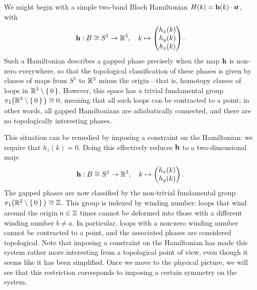 We might begin with a simple two-band Bloch Hamiltonian $H(k) = \vb{h}(k)\cdot\bm{\upsigma}$, with
\[
	\vb{h}: B\cong S^1\to\mathbb{R}^3,\quad k\mapsto\begin{pmatrix}
		h_x(k) \\ h_y(k) \\ h_z(k)
	\end{pmatrix}.
\]
Such a Hamiltonian describes a gapped phase precisely when the map $\vb{h}$ is non-zero everywhere, so that the topological classification of these phases is given by classes of maps from $S^1$ to $\mathbb{R}^3$ minus the origin---that is, homotopy classes of loops in $\mathbb{R}^3\setminus\set{0}$. However, this space has a trivial fundamental group $\pi_1\big(\mathbb{R}^3\setminus\set{0}\big)\cong0$, meaning that all such loops can be contracted to a point; in other words, all gapped Hamiltonians are adiabatically connected, and there are no topologically interesting phases.

This situation can be remedied by imposing a constraint on the Hamiltonian: we require that $h_z(k)=0$. Doing this effectively reduces $\vb{h}$ to a two-dimensional map:
\[
	\vb{h}: B\cong S^1\to\mathbb{R}^3,\quad k\mapsto\begin{pmatrix}
		h_x(k) \\ h_y(k)
	\end{pmatrix}.
\]
The gapped phases are now classified by the non-trivial fundamental group $\pi_1\big(\mathbb{R}^2\setminus\set{0}\big)\cong\mathbb{Z}$. This group is indexed by winding number: loops that wind around the origin $a\in\mathbb{Z}$ times cannot be deformed into those with a different winding number $b\neq a$. In particular, loops with a non-zero winding number cannot be contracted to a point, and the associated phases are considered topological. Note that imposing a constraint on the Hamiltonian has made this system rather more interesting from a topological point of view, even though it seems like it has been simplified. Once we move to the physical picture, we will see that this restriction corresponds to imposing a certain symmetry on the system.

